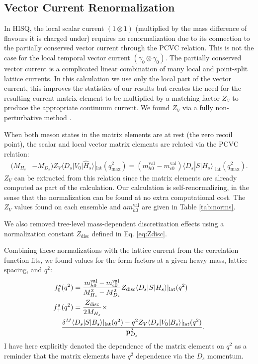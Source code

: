 \subsection{Vector Current Renormalization}

In HISQ, the local scalar current $(1\otimes 1)$ (multiplied by the mass difference of flavours it is charged under) requires no renormalization due to its connection to the partially conserved vector current through the PCVC relation. This is not the case for the local temporal vector current $(\gamma_0\otimes \gamma_0)$. The partially conserved vector current is a complicated linear combination of many local and point-split lattice currents. In this calculation we use only the local part of the vector current, this improves the statistics of our results but creates the need for the resulting current matrix element to be multiplied by a matching factor $Z_V$ to produce the appropriate continuum current. We found $Z_V$ via a fully non-perturbative method \cite{McNeile:2011ng,Donald:2013pea}.

When both meson states in the matrix elements are at rest (the zero recoil point), the scalar and local vector matrix elements are related via the PCVC relation:
\begin{align}
  ( M_{H_s}& - M_{D_s} ) Z_V \langle D_s | V_0 | \hat{H}_s \rangle|_{\text{lat}}(q^2_{\text{max}}) = (m^{\text{val}}_{h0} - m^{\text{val}}_{c0}) \langle D_s | S | H_s \rangle|_{\text{lat}}(q^2_{\text{max}}).
  \label{eq:ward}
\end{align}
$Z_V$ can be extracted from this relation since the matrix elements are already computed as part of the calculation. Our calculation is self-renormalizing, in the sense that the normalization can be found at no extra computational cost. The $Z_V$ values found on each ensemble and $am^{\text{val}}_{h0}$ are given in Table \ref{tab:norms}.

We also removed tree-level mass-dependent discretization effects using a normalization constant $Z_{\text{disc}}$ defined in Eq. \eqref{eq:Zdisc}.

Combining these normalizations with the lattice current from the correlation function fits, we found values for the form factors at a given heavy mass, lattice spacing, and $q^2$:
\begin{align}
  \nonumber
  f_0^s&(q^2) = {m^{\text{val}}_{h0} - m^{\text{val}}_{c0}\over M_{H_s}^2 - M_{D_s}^2 } Z_{\text{disc}} \langle D_s | S | H_s \rangle|_{\text{lat}}(q^2) \\
  \label{eq:normalizations}
  f_+^s&(q^2) = {Z_{\text{disc}} \over 2M_{H_s}} \times \\ \nonumber &{ \delta^M \langle D_s | S | B_s \rangle|_{\text{lat}}(q^2) - q^2 Z_V \langle D_s | V_0 | B_s \rangle|_{\text{lat}}(q^2) \over {\bf{p}}^2_{D_s}}.
\end{align}
I have here explicitly denoted the dependence of the matrix elements on $q^2$ as a reminder that the matrix elements have $q^2$ dependence via the $D_s$ momentum.

